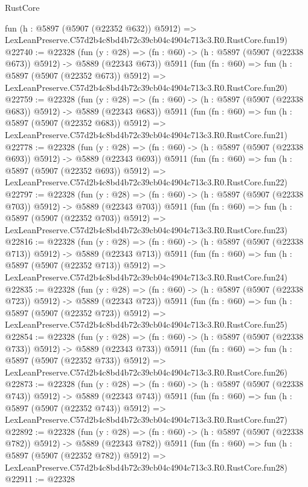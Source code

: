 \begin{lexlean}{RustCore}
\begin{coremodule}
    fun (h : @5897 (@5907 (@22352 @632)) @5912) =>
    LexLeanPreserve.C57d2b4c8bd4b72c39cb04c4904c713c3.R0.RustCore.fun19)
@22740 := @22328
    (fun (y : @28) => (fn : @60) -> (h : @5897 (@5907 (@22338 @673)) @5912) -> @5889 (@22343 @673))
    @5911
    (fun (fn : @60) =>
    fun (h : @5897 (@5907 (@22352 @673)) @5912) =>
    LexLeanPreserve.C57d2b4c8bd4b72c39cb04c4904c713c3.R0.RustCore.fun20)
@22759 := @22328
    (fun (y : @28) => (fn : @60) -> (h : @5897 (@5907 (@22338 @683)) @5912) -> @5889 (@22343 @683))
    @5911
    (fun (fn : @60) =>
    fun (h : @5897 (@5907 (@22352 @683)) @5912) =>
    LexLeanPreserve.C57d2b4c8bd4b72c39cb04c4904c713c3.R0.RustCore.fun21)
@22778 := @22328
    (fun (y : @28) => (fn : @60) -> (h : @5897 (@5907 (@22338 @693)) @5912) -> @5889 (@22343 @693))
    @5911
    (fun (fn : @60) =>
    fun (h : @5897 (@5907 (@22352 @693)) @5912) =>
    LexLeanPreserve.C57d2b4c8bd4b72c39cb04c4904c713c3.R0.RustCore.fun22)
@22797 := @22328
    (fun (y : @28) => (fn : @60) -> (h : @5897 (@5907 (@22338 @703)) @5912) -> @5889 (@22343 @703))
    @5911
    (fun (fn : @60) =>
    fun (h : @5897 (@5907 (@22352 @703)) @5912) =>
    LexLeanPreserve.C57d2b4c8bd4b72c39cb04c4904c713c3.R0.RustCore.fun23)
@22816 := @22328
    (fun (y : @28) => (fn : @60) -> (h : @5897 (@5907 (@22338 @713)) @5912) -> @5889 (@22343 @713))
    @5911
    (fun (fn : @60) =>
    fun (h : @5897 (@5907 (@22352 @713)) @5912) =>
    LexLeanPreserve.C57d2b4c8bd4b72c39cb04c4904c713c3.R0.RustCore.fun24)
@22835 := @22328
    (fun (y : @28) => (fn : @60) -> (h : @5897 (@5907 (@22338 @723)) @5912) -> @5889 (@22343 @723))
    @5911
    (fun (fn : @60) =>
    fun (h : @5897 (@5907 (@22352 @723)) @5912) =>
    LexLeanPreserve.C57d2b4c8bd4b72c39cb04c4904c713c3.R0.RustCore.fun25)
@22854 := @22328
    (fun (y : @28) => (fn : @60) -> (h : @5897 (@5907 (@22338 @733)) @5912) -> @5889 (@22343 @733))
    @5911
    (fun (fn : @60) =>
    fun (h : @5897 (@5907 (@22352 @733)) @5912) =>
    LexLeanPreserve.C57d2b4c8bd4b72c39cb04c4904c713c3.R0.RustCore.fun26)
@22873 := @22328
    (fun (y : @28) => (fn : @60) -> (h : @5897 (@5907 (@22338 @743)) @5912) -> @5889 (@22343 @743))
    @5911
    (fun (fn : @60) =>
    fun (h : @5897 (@5907 (@22352 @743)) @5912) =>
    LexLeanPreserve.C57d2b4c8bd4b72c39cb04c4904c713c3.R0.RustCore.fun27)
@22892 := @22328
    (fun (y : @28) => (fn : @60) -> (h : @5897 (@5907 (@22338 @782)) @5912) -> @5889 (@22343 @782))
    @5911
    (fun (fn : @60) =>
    fun (h : @5897 (@5907 (@22352 @782)) @5912) =>
    LexLeanPreserve.C57d2b4c8bd4b72c39cb04c4904c713c3.R0.RustCore.fun28)
@22911 := @22328

\end{coremodule}
\end{lexlean}
